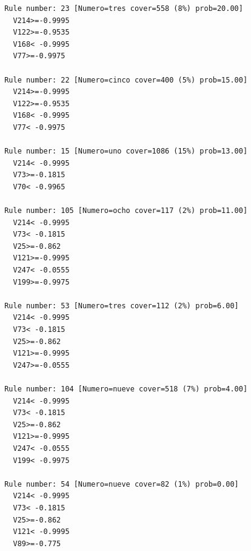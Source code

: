 \documentclass[11pt,a4paper]{report}
\begin{document}
\begin{itemize}
\begin{verbatim}
 Rule number: 23 [Numero=tres cover=558 (8%) prob=20.00]
   V214>=-0.9995
   V122>=-0.9535
   V168< -0.9995
   V77>=-0.9975

 Rule number: 22 [Numero=cinco cover=400 (5%) prob=15.00]
   V214>=-0.9995
   V122>=-0.9535
   V168< -0.9995
   V77< -0.9975

 Rule number: 15 [Numero=uno cover=1086 (15%) prob=13.00]
   V214< -0.9995
   V73>=-0.1815
   V70< -0.9965

 Rule number: 105 [Numero=ocho cover=117 (2%) prob=11.00]
   V214< -0.9995
   V73< -0.1815
   V25>=-0.862
   V121>=-0.9995
   V247< -0.0555
   V199>=-0.9975

 Rule number: 53 [Numero=tres cover=112 (2%) prob=6.00]
   V214< -0.9995
   V73< -0.1815
   V25>=-0.862
   V121>=-0.9995
   V247>=-0.0555

 Rule number: 104 [Numero=nueve cover=518 (7%) prob=4.00]
   V214< -0.9995
   V73< -0.1815
   V25>=-0.862
   V121>=-0.9995
   V247< -0.0555
   V199< -0.9975

 Rule number: 54 [Numero=nueve cover=82 (1%) prob=0.00]
   V214< -0.9995
   V73< -0.1815
   V25>=-0.862
   V121< -0.9995
   V89>=-0.775
\end{verbatim}
\end{itemize}
\end{document}
